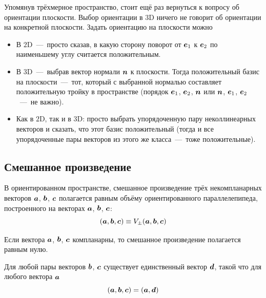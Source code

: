 \documentclass[a4paper,12pt]{article}
\begin{document}
  Упомянув трёхмерное пространство, стоит ещё раз вернуться к вопросу об ориентации плоскости.
  Выбор ориентации в $3$D ничего не говорит об ориентации на конкретной плоскости.
  Задать ориентацию на плоскости можно
  \begin{itemize}
    \item В $2$D~---~просто сказав, в какую сторону поворот от $\boldsymbol e_1$ к $\boldsymbol e_2$ по наименьшему углу считается положительным.
    
    \item В $3$D~---~выбрав вектор нормали $\boldsymbol n$ к плоскости.
    Тогда положительный базис на плоскости~---~тот, который с выбранной нормалью составляет положительную тройку в пространстве (порядок $\boldsymbol e_1$, $\boldsymbol e_2$, $\boldsymbol n$ или $\boldsymbol n$, $\boldsymbol e_1$, $\boldsymbol e_2$~---~не важно).
    
    \item Как в $2$D, так и в $3$D: просто выбрать упорядоченную пару неколлинеарных векторов и сказать, что этот базис положительный (тогда и все упорядоченные пары векторов из этого же класса~---~тоже положительные).
  \end{itemize}

  
  \subsection{Смешанное произведение}
  
  \begin{definition}
    В ориентированном пространстве, смешанное произведение трёх некомпланарных векторов $\boldsymbol a$, $\boldsymbol b$, $\boldsymbol c$ полагается равным объёму ориентированного параллелепипеда, построенного на векторах $\boldsymbol a$, $\boldsymbol b$, $\boldsymbol c$:
    \[
      (\boldsymbol a, \boldsymbol b, \boldsymbol c) \equiv V_{\pm}(\boldsymbol a, \boldsymbol b, \boldsymbol c)
    \]
    
    Если вектора $\boldsymbol a$, $\boldsymbol b$, $\boldsymbol c$ компланарны, то смешанное произведение полагается равным нулю.
  \end{definition}
  
  \begin{theorem}
    Для любой пары векторов $\boldsymbol b$, $\boldsymbol c$ существует единственный вектор $\boldsymbol d$, такой что для любого вектора $\boldsymbol a$
    \[
      (\boldsymbol a, \boldsymbol b, \boldsymbol c) = (\boldsymbol a, \boldsymbol d)
    \]
  \end{theorem}
  
\end{document}
